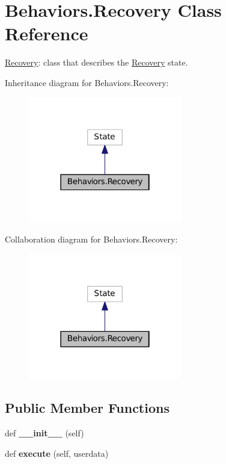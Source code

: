 \hypertarget{classBehaviors_1_1Recovery}{}\section{Behaviors.\+Recovery Class Reference}
\label{classBehaviors_1_1Recovery}


\hyperlink{classBehaviors_1_1Recovery}{Recovery}\+: class that describes the \hyperlink{classBehaviors_1_1Recovery}{Recovery} state.  




Inheritance diagram for Behaviors.\+Recovery\+:\nopagebreak
\begin{figure}[H]
\begin{center}
\leavevmode
\includegraphics[width=190pt]{classBehaviors_1_1Recovery__inherit__graph}
\end{center}
\end{figure}


Collaboration diagram for Behaviors.\+Recovery\+:\nopagebreak
\begin{figure}[H]
\begin{center}
\leavevmode
\includegraphics[width=190pt]{classBehaviors_1_1Recovery__coll__graph}
\end{center}
\end{figure}
\subsection*{Public Member Functions}
\begin{DoxyCompactItemize}
\item 
def {\bfseries \+\_\+\+\_\+init\+\_\+\+\_\+} (self)\hypertarget{classBehaviors_1_1Recovery_a9952b507236ae466b701935a6e2482d6}{}\label{classBehaviors_1_1Recovery_a9952b507236ae466b701935a6e2482d6}

\item 
def {\bfseries execute} (self, userdata)\hypertarget{classBehaviors_1_1Recovery_a83ad65d2d9ca8efabb0c9977c8b8449a}{}\label{classBehaviors_1_1Recovery_a83ad65d2d9ca8efabb0c9977c8b8449a}

\end{DoxyCompactItemize}


